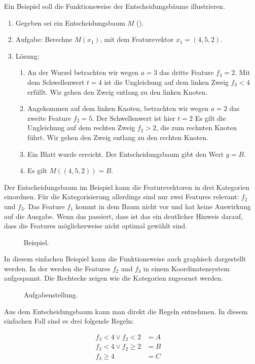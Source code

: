 \begin{exmp} Ein Beispiel soll die Funktionsweise der Entscheidungsbäume illustrieren.

	\begin{enumerate}
		\item Gegeben sei ein Entscheidungsbaum $M$ (). 
		\item Aufgabe: Berechne $M(x_1)$, mit dem Featurevektor $x_1 = (4, 5, 2)$.
		\item Lösung:
			\begin{enumerate}
				\item An der Wurzel betrachten wir wegen $a = 3$ das dritte Feature $f_3 = 2$.
					Mit dem Schwellenwert $t = 4$ ist die Ungleichung auf dem linken Zweig $f_3 < 4$ erfüllt.
					Wir gehen den Zweig entlang zu den linken Knoten.
				\item Angekommen auf dem linken Knoten, betrachten wir wegen $a = 2$ das zweite Feature $f_2 = 5$. 
					Der Schwellenwert ist hier $t = 2$
					Es gilt die Ungleichung auf dem rechten Zweig $f_2 > 2$, die zum rechnten Knoten führt.
					Wir gehen den Zweig entlang zu den rechten Knoten.
				\item Ein Blatt wurde erreicht.
					Der Entscheidungsbaum gibt den Wert $y = B$.	
				\item Es gilt $M((4, 5, 2)) = B$.
			\end{enumerate}
	\end{enumerate}

	Der Entscheidungsbaum im Beispiel kann die Featurevektoren in drei Kategorien einordnen.
	Für die Kategorisierung allerdings sind nur zwei Features relevant: $f_2$ und $f_3$.
	Das Feature $f_1$ kommt in dem Baum nicht vor und hat keine Auswirkung auf die Ausgabe.
	Wenn das passiert, dass ist das ein deutlicher Hinweis darauf, dass die Features möglicherweise nicht optimal gewählt sind.

\begin{figure}[ht]
	\centering
	
	\caption{Beispiel.}
	\label{fig:bas:decision_tree_example}
\end{figure}

In diesem einfachen Beispiel kann die Funktionsweise auch graphisch dargestellt werden. 
In der  werden die Features $f_2$ und $f_3$ in einem Koordinatensystem aufgespannt.
Die Rechtecke zeigen wie die Kategorien zugeornet werden.

\begin{figure}[ht]
	\centering
	
	\caption{Aufgabenstellung.}
	\label{fig:bas:task}
\end{figure}


Aus dem Entscheidungsbaum kann man direkt die Regeln entnehmen.
In diesem einfachen Fall sind es drei folgende Regeln:

\begin{align}
  f_3 < 4 \vee f_2 < 2 &= A\\
	f_3 < 4 \vee f_2 \geq 2 &= B\\
	f_3 \geq 4 &= C
\end{align}
\end{exmp}

